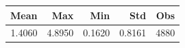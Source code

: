 \begin{tabular}{rrrrr}
\toprule
Mean & Max & Min & Std & Obs \\
\midrule
1.4060 & 4.8950 & 0.1620 & 0.8161 & 4880 \\
\bottomrule
\end{tabular}
